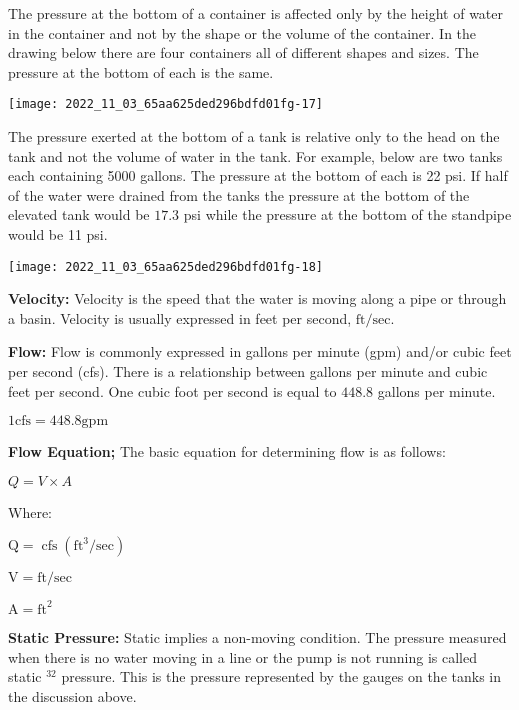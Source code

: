 The pressure at the bottom of a container is affected only by the height of water in the container and not by the shape or the volume of the container. In the drawing below there are four containers all of different shapes and sizes. The pressure at the bottom of each is the same.

\begin{center}
\texttt{[image: 2022\_11\_03\_65aa625ded296bdfd01fg-17]}
\end{center}
The pressure exerted at the bottom of a tank is relative only to the head on the tank and not the volume of water in the tank. For example, below are two tanks each containing 5000 gallons. The pressure at the bottom of each is 22 psi. If half of the water were drained from the tanks the pressure at the bottom of the elevated tank would be $17.3$ psi while the pressure at the bottom of the standpipe would be 11 psi.\\

\begin{center}
\texttt{[image: 2022\_11\_03\_65aa625ded296bdfd01fg-18]}
\end{center}

\textbf{Velocity: }  Velocity is the speed that the water is moving along a pipe or through a basin. Velocity is usually expressed in feet per second, $\mathrm{ft} / \mathrm{sec}$.

\textbf{Flow: } Flow is commonly expressed in gallons per minute (gpm) and/or cubic feet per second (cfs). There is a relationship between gallons per minute and cubic feet per second. One cubic foot per second is equal to $448.8$ gallons per minute.

$1 \mathrm{cfs}=448.8 \mathrm{gpm}$

\textbf{Flow Equation; }
The basic equation for determining flow is as follows:

$Q=V \times A$

Where:

$\mathrm{Q}=\operatorname{cfs}\left(\mathrm{ft}^{3} / \mathrm{sec}\right)$

$\mathrm{V}=\mathrm{ft} / \mathrm{sec}$

$\mathrm{A}=\mathrm{ft}^{2}$

\textbf{Static Pressure: }  Static implies a non-moving condition.  The pressure measured when there is no water moving in a line or the pump is not running is called static $^{32}$ pressure. This is the pressure represented by the gauges on the tanks in the discussion above.

